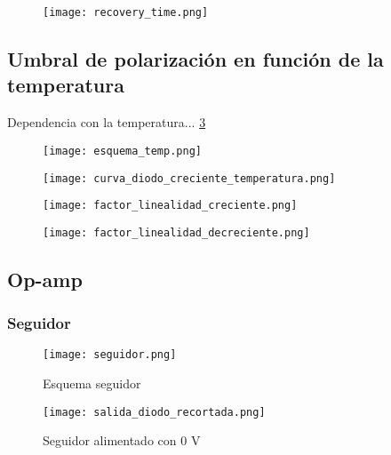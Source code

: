 \documentclass[a4paper, 11pt]{article}
\begin{document}
\begin{figure} [H]
\centering
\texttt{[image: recovery\_time.png]}
\caption{ \label{fig:recovery_time}}
\end{figure} 

\subsection*{Umbral de polarización en función de la temperatura}
Dependencia con la temperatura... \ref{fig:curva_diodo_creciente_temperatura}

\begin{figure} [H]
\centering
\texttt{[image: esquema\_temp.png]}
\caption{ \label{fig:esquema_temp}}
\end{figure} 

\begin{figure} [H]
\centering
\texttt{[image: curva\_diodo\_creciente\_temperatura.png]}
\caption{ \label{fig:curva_diodo_creciente_temperatura}}
\end{figure} 

\begin{figure} [H]
\centering
\texttt{[image: factor\_linealidad\_creciente.png]}
\caption{ \label{fig:factor_linealidad_creciente}}
\end{figure} 

\begin{figure} [H]
\centering
\texttt{[image: factor\_linealidad\_decreciente.png]}
\caption{ \label{fig:factor_linealidad_decreciente}}
\end{figure} 



\subsection*{Op-amp}

\subsubsection*{Seguidor}

\begin{figure} [H]
\centering
\texttt{[image: seguidor.png]}
\caption{ Esquema seguidor\label{fig:seguidor}}
\end{figure} 

\begin{figure} [H]
\centering
\texttt{[image: salida\_diodo\_recortada.png]}
\caption{ Seguidor alimentado con 0 V\label{fig:salida_diodo_recortada}}
\end{figure} 
\end{document}
